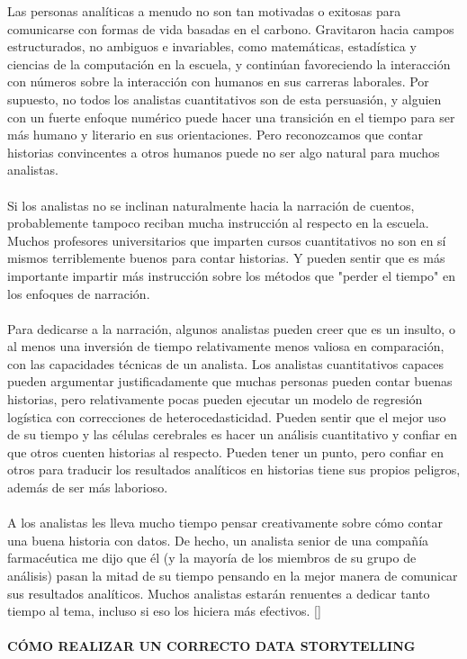 \documentclass[preprint,12pt]{elsarticle}
\begin{document}
	Las personas analíticas a menudo no son tan motivadas o exitosas para comunicarse con formas de vida basadas en el carbono. Gravitaron hacia campos estructurados, no ambiguos e invariables, como matemáticas, estadística y ciencias de la computación en la escuela, y continúan favoreciendo la interacción con números sobre la interacción con humanos en sus carreras laborales. Por supuesto, no todos los analistas cuantitativos son de esta persuasión, y alguien con un fuerte enfoque numérico puede hacer una transición en el tiempo para ser más humano y literario en sus orientaciones. Pero reconozcamos que contar historias convincentes a otros humanos puede no ser algo natural para muchos analistas.\\
	\\
	Si los analistas no se inclinan naturalmente hacia la narración de cuentos, probablemente tampoco reciban mucha instrucción al respecto en la escuela. Muchos profesores universitarios que imparten cursos cuantitativos no son en sí mismos terriblemente buenos para contar historias. Y pueden sentir que es más importante impartir más instrucción sobre los métodos que "perder el tiempo" en los enfoques de narración.\\
	\\
	Para dedicarse a la narración, algunos analistas pueden creer que es un insulto, o al menos una inversión de tiempo relativamente menos valiosa en comparación, con las capacidades técnicas de un analista. Los analistas cuantitativos capaces pueden argumentar justificadamente que muchas personas pueden contar buenas historias, pero relativamente pocas pueden ejecutar un modelo de regresión logística con correcciones de heterocedasticidad. Pueden sentir que el mejor uso de su tiempo y las células cerebrales es hacer un análisis cuantitativo y confiar en que otros cuenten historias al respecto. Pueden tener un punto, pero confiar en otros para traducir los resultados analíticos en historias tiene sus propios peligros, además de ser más laborioso.\\
	\\
	A los analistas les lleva mucho tiempo pensar creativamente sobre cómo contar una buena historia con datos. De hecho, un analista senior de una compañía farmacéutica me dijo que él (y la mayoría de los miembros de su grupo de análisis) pasan la mitad de su tiempo pensando en la mejor manera de comunicar sus resultados analíticos. Muchos analistas estarán renuentes a dedicar tanto tiempo al tema, incluso si eso los hiciera más efectivos. []\\
	\\
	\textbf{CÓMO REALIZAR UN CORRECTO DATA STORYTELLING}
	
\end{document}
